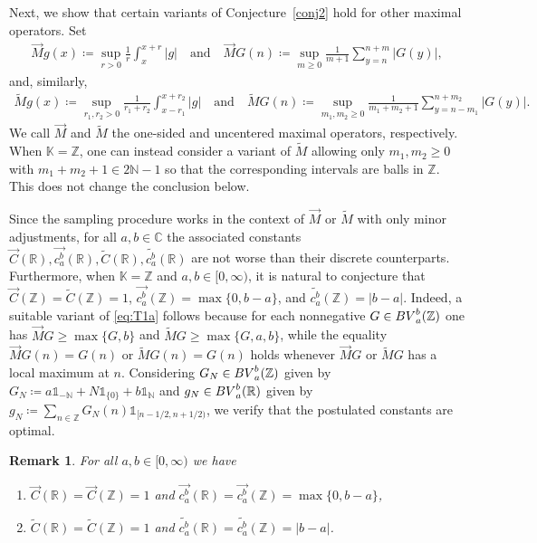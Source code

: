 \documentclass[leqno,11pt]{amsart}
\numberwithin{equation}{section}
\numberwithin{theorem}{section}
\newtheorem{remark}[theorem]{Remark}
\newcommand{\KK}{\mathbb{K}}
\newcommand{\RR}{\mathbb{R}}
\newcommand{\ZZ}{\mathbb{Z}}
\newcommand{\CC}{\mathbb{C}}
\newcommand{\NN}{\mathbb{N}}
\newcommand{\BV}{{\rm BV}}
\newcommand{\ind}[1]{{\mathds{1}_{{#1}}}}
\begin{document}
Next, we show that certain variants of Conjecture~\ref{conj2} 
hold for other maximal operators. Set
\begin{align*}
\overrightarrow{M}g(x) \coloneqq \sup_{r>0} \frac{1}{r} \int_{x}^{x+r} |g| 
\quad \text{and} \quad
\overrightarrow{M}G(n) \coloneqq \sup_{m\ge0} \frac{1}{m+1} \sum_{y  = n}^{n + m} |G(y)|,
\end{align*}
and, similarly,
\begin{align*}
\widetilde{M}g(x) \coloneqq \sup_{r_1,r_2>0} \frac{1}{r_1+r_2} \int_{x-r_1}^{x+r_2} |g|
\quad \text{and} \quad
\widetilde{M}G(n) \coloneqq \sup_{m_1,m_2\ge0} \frac{1}{m_1+m_2+1} \sum_{y  = n-m_1}^{n + m_2} |G(y)|.
\end{align*}
We call $\overrightarrow{M}$ and $\widetilde{M}$ the one-sided and uncentered maximal operators, respectively. When $\KK = \ZZ$, one can instead consider a variant of $\widetilde{M}$ allowing only
$m_1,m_2 \geq 0$ with $m_1 + m_2 +1 \in 2\NN-1$ so that the corresponding intervals are balls in $\ZZ$.
This does not change the conclusion below.  

Since the sampling procedure works in the context of $\overrightarrow{M}$ or $\widetilde{M}$ with only minor adjustments, for all $a,b \in \CC$ the associated constants $\overrightarrow{C}(\RR),  \overrightarrow{c_a^b}(\RR), \widetilde{C}(\RR), \widetilde{c_a^b}(\RR)$ are not worse than their discrete counterparts. Furthermore, when $\KK = \ZZ$ and $a,b \in [0,\infty)$, it is natural to conjecture that $\overrightarrow{C}(\ZZ) = \widetilde{C}(\ZZ) = 1$, $ \overrightarrow{c_a^b}(\ZZ) = \max\{ 0, b-a\}$, and $\widetilde{c_a^b}(\ZZ) = |b-a|$. Indeed, a suitable variant of \eqref{eq:T1a} follows because for each nonnegative $G \in \BV_a^b(\ZZ)$ one has $\overrightarrow{M}G \geq \max\{G,b\}$ and $\widetilde{M}G \geq \max\{G,a,b\}$, while the equality $\overrightarrow{M}G(n) = G(n)$ or $\widetilde{M}G(n) = G(n)$ holds whenever $\overrightarrow{M}G$ or $\widetilde{M}G$ has a local maximum
at $n$. Considering $G_N \in \BV_a^b(\ZZ)$ given by $G_N \coloneqq a \ind{-\NN} + N \ind{\{0\}} + b \ind{\NN}$ and $g_N \in \BV_a^b(\RR)$ given by $g_N \coloneqq \sum_{n \in \ZZ} G_N(n) \ind{[n-1/2,n+1/2)}$, we verify that the postulated constants are optimal. 

\begin{remark} \label{R2}
	For all $a,b \in [0,\infty)$ we have
	\begin{enumerate}
		\item[{\rm(1)}] $
		\overrightarrow{C}(\RR) = \overrightarrow{C}(\ZZ) = 1$
		and $\overrightarrow{c_a^b}(\RR) = \overrightarrow{c_a^b}(\ZZ) = \max\{ 0, b-a\}$,
		\item[{\rm(2)}] $\widetilde{C}(\RR) = \widetilde{C}(\ZZ) = 1$
		and $\widetilde{c_a^b}(\RR) = \widetilde{c_a^b}(\ZZ) = |b-a|$.
	\end{enumerate}
\end{remark}
\end{document}
